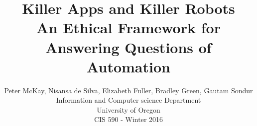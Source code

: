 \documentclass[12pt,twocolumn]{IEEEtran11}
\begin{document}


\title{%
  Killer Apps and Killer Robots \\
\Large An Ethical Framework for Answering Questions of Automation
}
\author{
Peter McKay, Nisansa de Silva, Elizabeth Fuller, Bradley Green, 
Gautam Sondur\\
Information and Computer science Department\\
University of Oregon\\
CIS 590 - Winter 2016\\
}
\maketitle
% 









\end{document}
